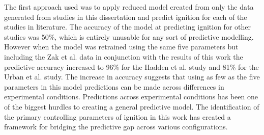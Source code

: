     The first approach used was to apply reduced model created from only the data generated from studies in this dissertation and predict ignition for each of the studies in literature. The accuracy of the model at predicting ignition for other studies was 50\%, which is entirely unusable for any sort of predictive modelling. However when the model was retrained using the same five parameters but including the Zak et al. data in conjunction with the results of this work the predictive accuracy increased to 96\% for the Hadden et al. study and 81\% for the Urban et al. study. The increase in accuracy suggests that using as few as the five parameters in this model predictions can be made across differences in experimental conditions. Predictions across experimental conditions has been one of the biggest hurdles to creating a general predictive model. The identification of the primary controlling parameters of ignition in this work has created a framework for bridging the predictive gap across various configurations.  
    
